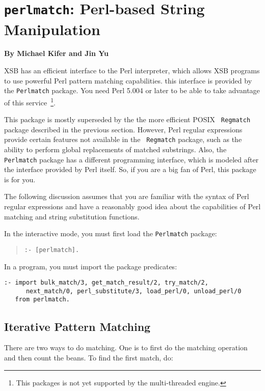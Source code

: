 \chapter{{\tt perlmatch}: Perl-based String Manipulation}

\begin{center}
{\Large {\bf By Michael Kifer and  Jin Yu }}
\end{center}

XSB has an efficient interface to the Perl interpreter, which allows
XSB programs to use powerful Perl pattern matching capabilities. this
interface is provided by the {\tt Perlmatch} package. You need Perl
5.004 or later to be able to take advantage of this
service~\footnote{This packages is not yet supported by the
  multi-threaded engine.}.

This package is mostly superseded by the the more efficient POSIX {\tt
  Regmatch} package described in the previous section. However, Perl
regular expressions provide certain features not available in the {\tt
  Regmatch} package, such as the ability to perform global
replacements of matched substrings. Also, the {\tt Perlmatch} package
has a different programming interface, which is modeled after the
interface provided by Perl itself. So, if you are a big fan of Perl,
this package is for you.

The following discussion assumes that you are familiar with the syntax of
Perl regular expressions and have a reasonably good idea about the
capabilities of Perl matching and string substitution functions.

In the interactive mode, you must first load the {\tt Perlmatch}  package:
\begin{quote}
 {\tt  :- [perlmatch]. }
\end{quote}

In a program, you must import the package predicates:
\begin{verbatim}
:- import bulk_match/3, get_match_result/2, try_match/2,
	  next_match/0, perl_substitute/3, load_perl/0, unload_perl/0
   from perlmatch.
\end{verbatim}

\section{Iterative Pattern Matching}
There are two ways to do matching. One is to first do the matching
operation and then count the beans. To find the first match, do:

